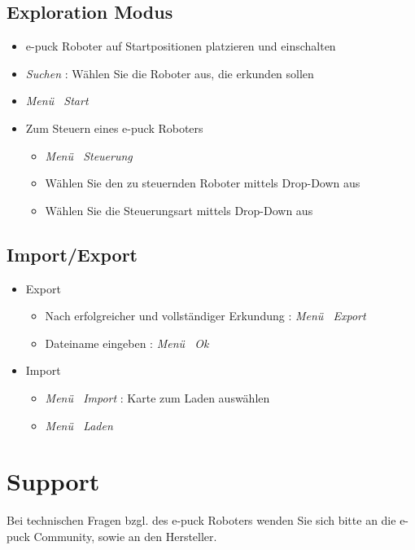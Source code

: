 \documentclass[10pt,a4paper]{article}
\let\oldsection\section
\renewcommand{\section}{\newpage \oldsection}
\begin{document}
	\subsection{Exploration Modus}
		\begin{itemize}
			\item{e-puck Roboter auf Startpositionen platzieren und einschalten}
			\item{\textit{Suchen} : W\"ahlen Sie die Roboter aus, die erkunden sollen}			
			\item{\textit{Men\"u \frq \frq \ Start}}
			\item{Zum Steuern eines e-puck Roboters}
			\begin{itemize}
				\item{\textit{Men\"u \frq \frq \ Steuerung}}
				\item{W\"ahlen Sie den zu steuernden Roboter mittels Drop-Down aus}
				\item{W\"ahlen Sie die Steuerungsart mittels Drop-Down aus}
			\end{itemize}
		\end{itemize}
	\subsection{Import/Export}
		\begin{itemize}
			\item{Export}
				\begin{itemize}
					\item{Nach erfolgreicher und vollst\"andiger Erkundung : \textit{Men\"u \frq \frq \ Export}}
					\item{Dateiname eingeben : \textit{Men\"u \frq \frq \ Ok}}
				\end{itemize}
			\item{Import}			
				\begin{itemize}
					\item{\textit{Men\"u \frq \frq \ Import} : Karte zum Laden ausw\"ahlen}
					\item{\textit{Men\"u \frq \frq \ Laden}}
				\end{itemize}
		\end{itemize}
\section{Support}
	Bei technischen Fragen bzgl. des e-puck Roboters wenden Sie sich bitte an die e-puck Community, sowie an den Hersteller.
\end{document}
